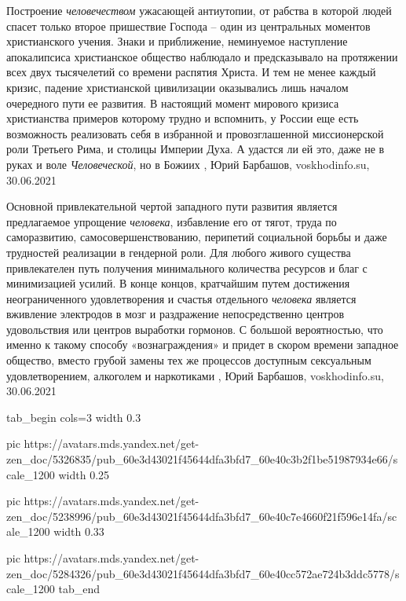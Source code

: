 Построение \emph{человечеством} ужасающей антиутопии, от рабства в которой людей
спасет только второе пришествие Господа – один из центральных моментов
христианского учения. Знаки и приближение, неминуемое наступление апокалипсиса
христианское общество наблюдало и предсказывало на протяжении всех двух
тысячелетий со времени распятия Христа. И тем не менее каждый кризис, падение
христианской цивилизации оказывались лишь началом очередного пути ее развития.
В настоящий момент мирового кризиса христианства примеров которому трудно и
вспомнить, у России еще есть возможность реализовать себя в избранной и
провозглашенной миссионерской роли Третьего Рима, и столицы Империи Духа.  А
удастся ли ей это, даже не в руках и воле \emph{Человеческой}, но в Божиих
, 
Юрий Барбашов, voskhodinfo.su, 30.06.2021

Основной привлекательной чертой западного пути развития является предлагаемое
упрощение \emph{человека}, избавление его от тягот, труда по саморазвитию,
самосовершенствованию, перипетий социальной борьбы и даже трудностей реализации
в гендерной роли. Для любого живого существа привлекателен путь получения
минимального количества ресурсов и благ с минимизацией усилий. В конце концов,
кратчайшим путем достижения неограниченного удовлетворения и счастья отдельного
\emph{человека} является вживление электродов в мозг и раздражение непосредственно
центров удовольствия или центров выработки гормонов. С большой вероятностью,
что именно к такому способу «вознаграждения» и придет в скором времени западное
общество, вместо грубой замены тех же процессов доступным сексуальным
удовлетворением, алкоголем и наркотиками
, 
Юрий Барбашов, voskhodinfo.su, 30.06.2021


\ifcmt
  tab_begin cols=3
	width 0.3

		 pic https://avatars.mds.yandex.net/get-zen_doc/5326835/pub_60e3d43021f45644dfa3bfd7_60e40c3b2f1be51987934e66/scale_1200
	width 0.25

     pic https://avatars.mds.yandex.net/get-zen_doc/5238996/pub_60e3d43021f45644dfa3bfd7_60e40c7e4660f21f596e14fa/scale_1200
	width 0.33

     pic https://avatars.mds.yandex.net/get-zen_doc/5284326/pub_60e3d43021f45644dfa3bfd7_60e40cc572ae724b3ddc5778/scale_1200
  tab_end
\fi

